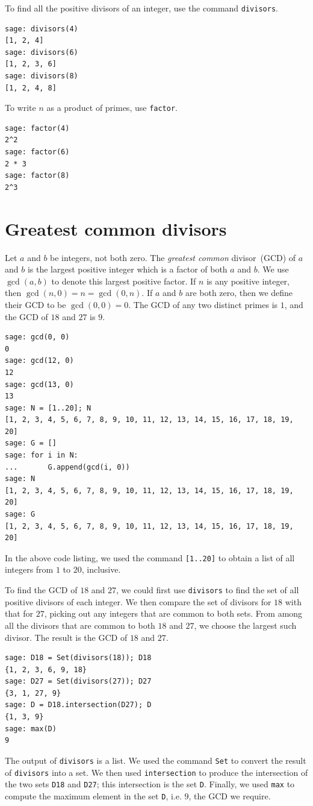 To find all the positive divisors of an integer, use the command
\verb!divisors!.
%
\begin{lstlisting}
sage: divisors(4)
[1, 2, 4]
sage: divisors(6)
[1, 2, 3, 6]
sage: divisors(8)
[1, 2, 4, 8]
\end{lstlisting}
%
To write $n$ as a product of primes, use \verb!factor!.

\begin{lstlisting}
sage: factor(4)
2^2
sage: factor(6)
2 * 3
sage: factor(8)
2^3
\end{lstlisting}



\section{Greatest common divisors}

Let $a$ and $b$ be integers, not both zero. The \emph{greatest common}
divisor~(GCD) of $a$ and $b$ is the largest positive integer which is
a factor of both $a$ and $b$. We use $\gcd(a,b)$ to denote this
largest positive factor. If $n$ is any positive integer, then
$\gcd(n, 0) = n = \gcd(0, n)$. If $a$ and $b$ are both zero, then we
define their GCD to be $\gcd(0,0) = 0$. The GCD of any two distinct
primes is $1$, and the GCD of $18$ and $27$ is $9$.
%
\begin{lstlisting}
sage: gcd(0, 0)
0
sage: gcd(12, 0)
12
sage: gcd(13, 0)
13
sage: N = [1..20]; N
[1, 2, 3, 4, 5, 6, 7, 8, 9, 10, 11, 12, 13, 14, 15, 16, 17, 18, 19, 20]
sage: G = []
sage: for i in N:
...       G.append(gcd(i, 0))
sage: N
[1, 2, 3, 4, 5, 6, 7, 8, 9, 10, 11, 12, 13, 14, 15, 16, 17, 18, 19, 20]
sage: G
[1, 2, 3, 4, 5, 6, 7, 8, 9, 10, 11, 12, 13, 14, 15, 16, 17, 18, 19, 20]
\end{lstlisting}
%
In the above code listing, we used the command \verb![1..20]! to
obtain a list of all integers from $1$ to $20$, inclusive.

To find the GCD of $18$ and $27$, we could first use \verb!divisors!
to find the set of all positive divisors of each integer. We then
compare the set of divisors for $18$ with that for $27$, picking out
any integers that are common to both sets. From among all the divisors
that are common to both $18$ and $27$, we choose the largest such
divisor. The result is the GCD of $18$ and $27$.
%
\begin{lstlisting}
sage: D18 = Set(divisors(18)); D18
{1, 2, 3, 6, 9, 18}
sage: D27 = Set(divisors(27)); D27
{3, 1, 27, 9}
sage: D = D18.intersection(D27); D
{1, 3, 9}
sage: max(D)
9
\end{lstlisting}
%
The output of \verb!divisors! is a list. We used the command
\verb!Set! to convert the result of \verb!divisors! into a set. We
then used \verb!intersection! to produce the intersection of the two
sets \verb!D18! and \verb!D27!; this intersection is the set
\verb!D!. Finally, we used \verb!max! to compute the maximum element
in the set \verb!D!, i.e. $9$, the GCD we require.

